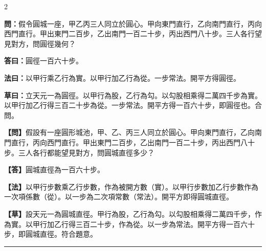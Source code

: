 \documentclass[11pt,a4paper]{article}
\newcommand{\longline}{\noindent\rule{\textwidth}{0.4pt}}
\newcommand{\wenC}[1]{\par\noindent\textbf{\textcolor{probcolor}{問：}}{#1}\par}
\newcommand{\daC}[1]{\par\noindent\textbf{\textcolor{anscolor}{答曰：}}{#1}\par}
\newcommand{\fayueC}[1]{\par\noindent\textbf{\textcolor{methodcolor}{法曰：}}{#1}\par}
\newcommand{\caoyueC}[1]{\par\noindent\textbf{草曰：}{#1}\par}
\newcommand{\wenM}[1]{\par\noindent\textbf{\textcolor{probcolor}{【問】}}{#1}\par}
\newcommand{\daM}[1]{\par\noindent\textbf{\textcolor{anscolor}{【答】}}{#1}\par}
\newcommand{\fayueM}[1]{\par\noindent\textbf{\textcolor{methodcolor}{【法】}}{#1}\par}
\newcommand{\caoyueM}[1]{\par\noindent\textbf{【草】}{#1}\par}
\begin{document}
\begin{paracol}{2}

\wenC{假令圓城一座，甲乙丙三人同立於圓心。甲向東門直行，乙向南門直行，丙向西門直行。甲出東門二百步，乙出南門一百二十步，丙出西門八十步。三人各行望見對方，問圓徑幾何？}

\daC{圓徑一百六十步。}

\fayueC{以甲行乘乙行為實。以甲行加乙行為從。一步常法。開平方得圓徑。}

\caoyueC{立天元一為圓徑。以甲行為股，乙行為勾。以勾股相乘得二萬四千步為實。以甲行加乙行得三百二十步為從。一步常法。開平方得一百六十步，即圓徑也。合問。}

\switchcolumn

\wenM{假設有一座圓形城池，甲、乙、丙三人同立於圓心。甲向東門直行，乙向南門直行，丙向西門直行。甲出東門二百步，乙出南門一百二十步，丙出西門八十步。三人各行都能望見對方，問圓城直徑多少？}

\daM{圓城直徑為一百六十步。}

\fayueM{以甲行步數乘乙行步數，作為被開方數（實）。以甲行步數加乙行步數作為一次項係數（從）。以一步為二次項常數（常法）。開平方即得圓城直徑。}

\caoyueM{設天元一為圓城直徑。甲行為股，乙行為勾。以勾股相乘得二萬四千步，作為實。以甲行加乙行得三百二十步，作為從。以一步為常法。開平方得一百六十步，即圓城直徑。符合題意。}

\end{paracol}

\vspace{0.3cm}
\longline
\end{document}
